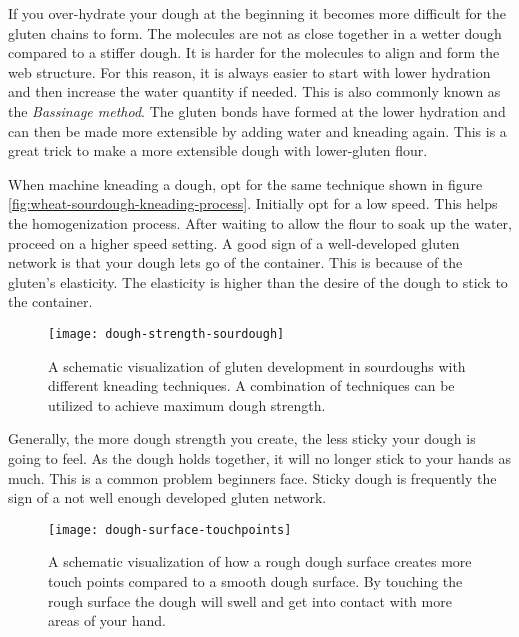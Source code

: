 If you over-hydrate your dough at the beginning it becomes more difficult
for the gluten chains to form. The molecules are not as close together in
a wetter dough compared to a stiffer dough. It is harder for the molecules
to align and form the web structure. For this reason, it is always easier
to start with lower hydration and then increase the water quantity if needed.
This is also commonly known as the \textit{Bassinage method}. The gluten
bonds have formed at the lower hydration and can then be made more extensible
by adding water and kneading again. This is a great trick to make
a more extensible dough with lower-gluten flour. \cite{bassinage+technique}

When machine kneading a dough, opt for the same technique shown in figure \ref*{fig:wheat-sourdough-kneading-process}.
Initially opt for a low speed. This helps the homogenization process.
After waiting to allow the flour to soak up the water, proceed on a higher speed
setting. A good sign of a well-developed gluten network is
that your dough lets go of the container. This is because of the gluten's elasticity.
The elasticity is higher than the desire of the
dough to stick to the container.

\begin{figure}[!htb]
  \texttt{[image: dough-strength-sourdough]}
  \caption{A schematic visualization of
  gluten development in sourdoughs with different kneading techniques.
  A combination of techniques can be utilized to achieve maximum
  dough strength.
  }
  \label{fig:dough-strength-sourdough}
\end{figure}

Generally, the more dough strength you create, the less sticky your dough is going to
feel. As the dough holds together, it will no longer stick to your hands as
much. This is a common problem beginners face. Sticky dough is frequently
the sign of a not well enough developed gluten network.

\begin{figure}[!htb]
  \texttt{[image: dough-surface-touchpoints]}
  \caption{A schematic visualization of how a rough dough surface
  creates more touch points compared to a smooth dough surface.
  By touching the rough surface the dough will swell and get into
  contact with more areas of your hand.
  }
  \label{fig:dough-touch-points}
\end{figure}

